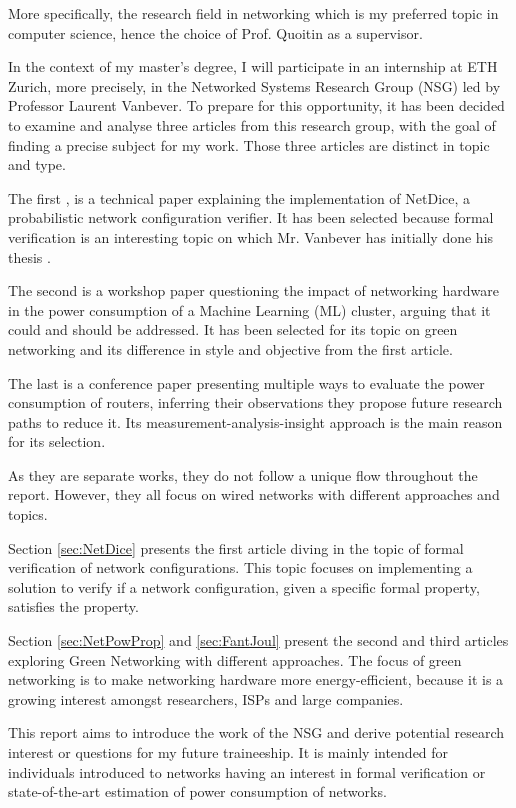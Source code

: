 \documentclass[conference]{IEEEtran} %
\begin{document}
More specifically, the research field in networking which is my preferred topic in computer science, hence the choice of Prof. Quoitin as a supervisor.  

In the context of my master's degree, I will participate in an internship at ETH Zurich, more precisely, in the Networked Systems Research Group (NSG) led by Professor Laurent Vanbever.
To prepare for this opportunity, it has been decided to examine and analyse three articles from this research group, with the goal of finding a precise subject for my work.
Those three articles are distinct in topic and type.

The first \cite{steffen2020netdice}, is a technical paper explaining the implementation of NetDice, a probabilistic network configuration verifier.  
It has been selected because formal verification is an interesting topic on which Mr. Vanbever has initially done his thesis \cite{LaurentThesis}.   

The second \cite{NetPowProp} is a workshop paper questioning the impact of networking hardware in the power consumption of a Machine Learning (ML) cluster, arguing that it could and should be addressed.
It has been selected for its topic on green networking and its difference in style and objective from the first article.

The last \cite{FantasticJoul} is a conference paper presenting multiple ways to evaluate the power consumption of routers, inferring their observations they propose future research paths to reduce it. 
Its measurement-analysis-insight approach is the main reason for its selection.

As they are separate works, they do not follow a unique flow throughout the report.  
However, they all focus on wired networks with different approaches and topics.      

Section \ref{sec:NetDice} presents the first article diving in the topic of formal verification of network configurations.
This topic focuses on implementing a solution to verify if a network configuration, given a specific formal property, satisfies the property. 

Section \ref{sec:NetPowProp} and \ref{sec:FantJoul} present the second and third articles exploring Green Networking with different approaches.   
The focus of green networking is to make networking hardware more energy-efficient, because it is a growing interest amongst researchers, ISPs and large companies. 

This report aims to introduce the work of the NSG and derive potential research interest or questions for my future traineeship.   
It is mainly intended for individuals introduced to networks having an interest in formal verification or state-of-the-art estimation of power consumption of networks.     
\end{document}
